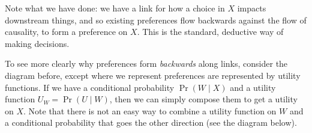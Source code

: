 \documentclass{article}
\begin{document}
	\begin{center}
	\end{center}

	Note what we have done: we have a link for how a choice in $X$ impacts downstream things, and so existing preferences flow backwards against the flow of causality, to form a preference on $X$. This is the standard, deductive way of making decisions.
	
	
	To see more clearly why preferences form \textit{backwards} along links, consider the diagram before, except where we represent preferences are represented by utility functions. If we have a conditional probability $\Pr(W \mid X)$ and a utility function $U_W = \Pr(U \mid W)$, then we can simply compose them to get a utility on $X$. Note that there is not an easy way to combine a utility function on $W$ and a conditional probability that goes the other direction (see the diagram below).
	
\end{document}
